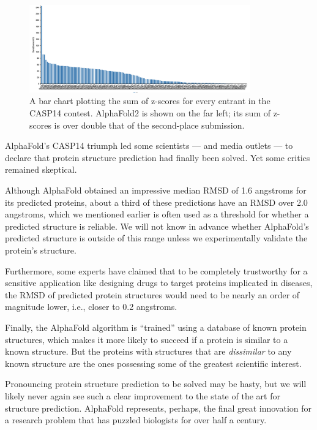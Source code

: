 \begin{figure}[h]
	\centering
	\mySfFamily
	\includegraphics[width = 0.85\textwidth]{../images/CASP14_overall_results.png}
	\caption{A bar chart plotting the sum of z-scores for every entrant in the CASP14 contest. AlphaFold2 is shown on the far left; its sum of z-scores is over double that of the second-place submission.}
	\label{fig:CASP14_overall_results}
\end{figure}

AlphaFold's CASP14 triumph led some scientists --- and media outlets --- to declare that protein structure prediction had finally been solved. Yet some critics remained skeptical.

Although AlphaFold obtained an impressive median RMSD of 1.6 angstroms for its predicted proteins, about a third of these predictions have an RMSD over 2.0 angstroms, which we mentioned earlier is often used as a threshold for whether a predicted structure is reliable. We will not know in advance whether AlphaFold's predicted structure is outside of this range unless we experimentally validate the protein's structure.

Furthermore, some experts have claimed that to be completely trustworthy for a sensitive application like designing drugs to target proteins implicated in diseases, the RMSD of predicted protein structures would need to be nearly an order of magnitude lower, i.e., closer to 0.2 angstroms.

Finally, the AlphaFold algorithm is ``trained'' using a database of known protein structures, which makes it more likely to succeed if a protein is similar to a known structure. But the proteins with structures that are \textit{dissimilar} to any known structure are the ones possessing some of the greatest scientific interest.

Pronouncing protein structure prediction to be solved may be hasty, but we will likely never again see such a clear improvement to the state of the art for structure prediction. AlphaFold represents, perhaps, the final great innovation for a research problem that has puzzled biologists for over half a century.

